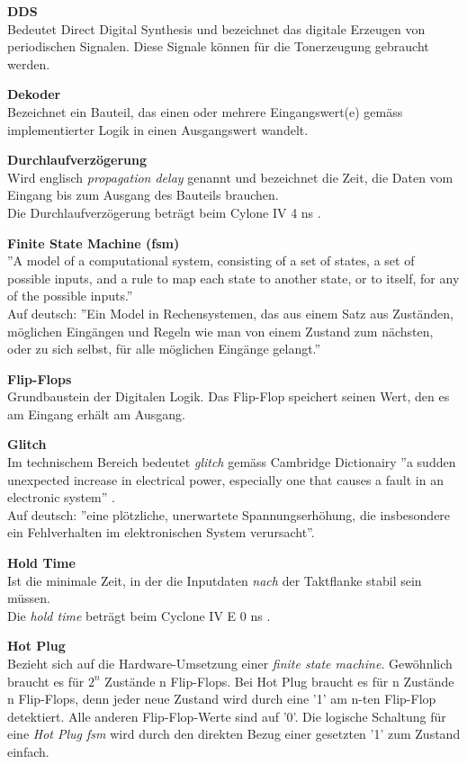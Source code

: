\textbf{DDS}\\
Bedeutet Direct Digital Synthesis und bezeichnet das digitale Erzeugen von periodischen Signalen. Diese Signale können für die Tonerzeugung gebraucht werden.

\textbf{Dekoder}\\
Bezeichnet ein Bauteil, das einen oder mehrere Eingangswert(e) gemäss implementierter Logik in einen Ausgangswert wandelt.

\textbf{Durchlaufverzögerung}\\
Wird englisch \textit{propagation delay} genannt und bezeichnet die Zeit, die Daten vom Eingang bis zum Ausgang des Bauteils brauchen.\\
Die Durchlaufverzögerung beträgt beim Cylone IV 4 ns \cite{Handbook_Altera}.

\textbf{Finite State Machine (fsm)}\\
''A model of a computational system, consisting of a set of states, a set of possible inputs, and a rule to map each state to another state, or to itself, for any of the possible inputs.''\cite{fsm}\\
Auf deutsch: ''Ein Model in Rechensystemen, das aus einem Satz aus Zuständen, möglichen Eingängen und Regeln wie man von einem Zustand zum nächsten, oder zu sich selbst, für alle möglichen Eingänge gelangt.''

\textbf{Flip-Flops}\\
Grundbaustein der Digitalen Logik. Das Flip-Flop speichert seinen Wert, den es am Eingang erhält am Ausgang.

\textbf{Glitch}\\
Im technischem Bereich bedeutet \textit{glitch} gemäss Cambridge Dictionairy ''a sudden unexpected increase in electrical power, especially one that causes a fault in an electronic system'' \cite{dictionair}.\\
Auf deutsch: ''eine plötzliche, unerwartete Spannungserhöhung, die insbesondere ein Fehlverhalten im elektronischen System verursacht''.

\textbf{Hold Time}\\
Ist die minimale Zeit, in der die Inputdaten \textit{nach} der Taktflanke stabil sein müssen.\\
Die \textit{hold time} beträgt beim  Cyclone IV E 0 ns \cite{Handbook_Altera}.

\textbf{Hot Plug}\\
Bezieht sich auf die Hardware-Umsetzung einer \textit{finite state machine}. Gewöhnlich braucht es für \begin{math} 2^n \end{math} Zustände n Flip-Flops. Bei Hot Plug braucht es für n Zustände n Flip-Flops, denn jeder neue Zustand wird durch eine '1' am n-ten Flip-Flop detektiert. Alle anderen Flip-Flop-Werte sind auf '0'. Die logische Schaltung für eine \textit{Hot Plug fsm} wird durch den direkten Bezug einer gesetzten '1' zum Zustand einfach.


